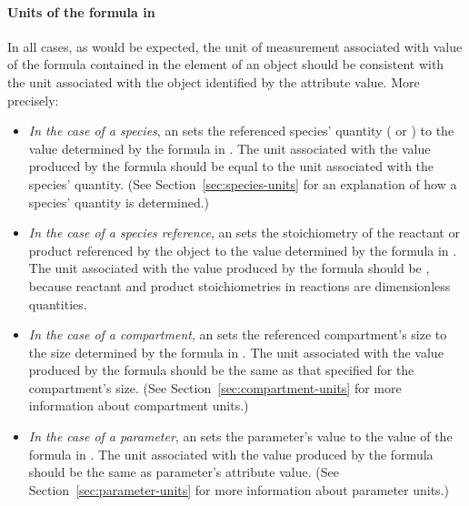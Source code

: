 \paragraph{Units of the  formula in }

In all cases, as would be expected, the unit of measurement
associated with value of the formula contained in the 
element of an \EventAssignment object should be consistent with
the unit associated with the object identified by the
 attribute value.  More precisely:
\begin{itemize}
  
\item \emph{In the case of a species}, an \EventAssignment sets
  the referenced species' quantity ( or
  ) to the value determined by the formula in
  .  The unit associated with the value produced by
  the  formula should be equal to the unit associated
  with the species' quantity.  (See
  Section~\ref{sec:species-units} for an explanation of how a
  species' quantity is determined.)

\item \emph{In the case of a species reference}, an
  \EventAssignment sets the stoichiometry of the reactant or
  product referenced by the \SpeciesReference object to the value
  determined by the formula in .  The unit associated
  with the value produced by the  formula should be
  , because reactant and product
  stoichiometries in reactions are dimensionless quantities.

\item \emph{In the case of a compartment}, an \EventAssignment
  sets the referenced compartment's size to the size determined by
  the formula in .  The unit associated with the value
  produced by the  formula should be the same as that
  specified for the compartment's size.  (See
  Section~\ref{sec:compartment-units} for more information about
  compartment units.)

\item \emph{In the case of a parameter}, an \EventAssignment sets
  the parameter's value to the value of the formula in
  .  The unit associated with the value produced by
  the  formula should be the same as parameter's
   attribute value.  (See
  Section~\ref{sec:parameter-units} for more information about
  parameter units.)

\end{itemize}

